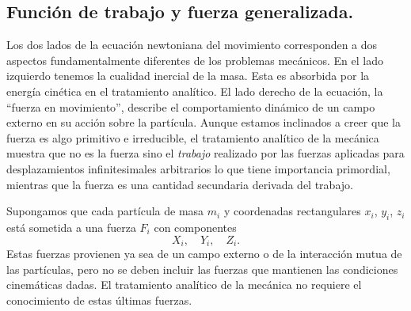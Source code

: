 \documentclass[12pt,a4paper]{book}
\begin{document}
\begin{center}
\section{Funci\'on de trabajo y fuerza generalizada.}

Los dos lados de la ecuaci\'on newtoniana del movimiento corresponden a dos aspectos fundamentalmente diferentes de los problemas mec\'anicos. En el lado izquierdo tenemos la cualidad inercial de la masa. Esta es absorbida por la energ\'ia cin\'etica en el tratamiento anal\'itico. El lado derecho de la ecuaci\'on, la ``fuerza en movimiento'', describe el comportamiento din\'amico de un campo externo en su acci\'on sobre la part\'icula. Aunque estamos inclinados a creer que la fuerza es algo primitivo e irreducible, el tratamiento anal\'itico de la mec\'anica muestra que no es la fuerza sino el \textit{trabajo} realizado por las fuerzas aplicadas para desplazamientos infinitesimales arbitrarios lo que tiene importancia primordial, mientras que la fuerza es una cantidad secundaria derivada del trabajo.

Supongamos que cada part\'icula de masa $m_i$ y coordenadas rectangulares $x_i$, $y_i$, $z_i$ est\'a sometida a una fuerza $F_i$ con componentes
\begin{equation}
X_i,\quad Y_i,\quad Z_i.
\tag{17.1}
\end{equation}
Estas fuerzas provienen ya sea de un campo externo o de la interacci\'on mutua de las part\'iculas, pero no se deben incluir las fuerzas que mantienen las condiciones cinem\'aticas dadas. El tratamiento anal\'itico de la mec\'anica no requiere el conocimiento de estas \'ultimas fuerzas.


\end{center}
\end{document}
